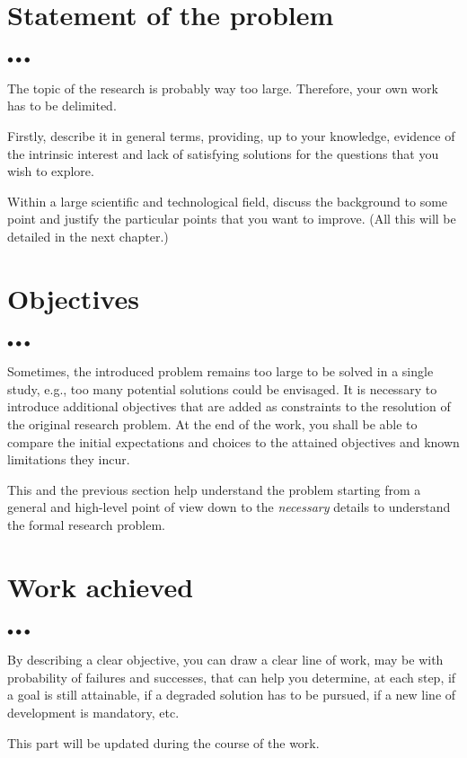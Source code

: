 \documentclass[11pt, english, screen, research-development]{report-rd-info}
\newenvironment{explanation}
{\color{blue}
 \begin{list}{}{\hspace{0.2\textwidth}\color{blue}}\item $\bullet\bullet\bullet$
}
{\end{list}}
\begin{document}
\section{Statement of the problem}

\begin{explanation}
   The topic of the research is probably way too large.
   Therefore, your own work has to be delimited.

   Firstly, describe it in general terms, providing, up to your knowledge, evidence of the intrinsic interest and lack of satisfying solutions for the questions that you wish to explore.

   Within a large scientific and technological field, discuss the background to some point and justify the particular points that you want to improve.
   (All this will be detailed in the next chapter.)
\end{explanation}

\section{Objectives}

\begin{explanation}
   Sometimes, the introduced problem remains too large to be solved in a single study, e.g., too many potential solutions could be envisaged.
   It is necessary to introduce additional objectives that are added as constraints to the resolution of the original research problem.
   At the end of the work, you shall be able to compare the initial expectations and choices to the attained objectives and known limitations they incur.

   This and the previous section help understand the problem starting from a general and high-level point of view down to the \emph{necessary} details to understand the formal research problem.
\end{explanation}

\section{Work achieved}

\begin{explanation}
   By describing a clear objective, you can draw a clear line of work, may be with probability of failures and successes, that can help you determine, at each step, if a goal is still attainable, if a degraded solution has to be pursued, if a new line of development is mandatory, etc.

   This part will be updated during the course of the work.
\end{explanation}
\end{document}

